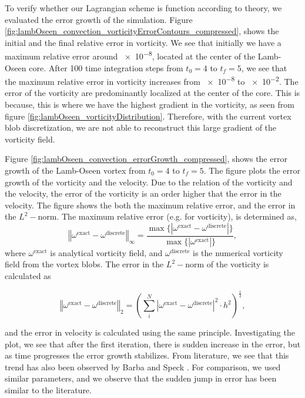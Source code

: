 To verify whether our Lagrangian scheme is function according to theory, we evaluated the error growth of the simulation. Figure \ref{fig:lambOseen_convection_vorticityErrorContours_compressed}, shows the initial and the final relative error in vorticity. We see that initially we have a maximum relative error around \num{e-8}, located at the center of the Lamb-Oseen core. After 100 time integration steps from $t_0=4$ to $t_f=5$, we see that the maximum relative error in vorticity increases from \num{e-8} to \num{e-2}. The error of the vorticity are predominantly localized at the center of the core. This is because, this is where we have the highest gradient in the vorticity, as seen from figure \ref{fig:lambOseen_vorticityDistribution}. Therefore, with the current vortex blob discretization, we are not able to reconstruct this large gradient of the vorticity field. 

Figure \ref{fig:lambOseen_convection_errorGrowth_compressed}, shows the error growth of the Lamb-Oseen vortex from $t_0=4$ to $t_f=5$. The figure plots the error growth of the vorticity and the velocity. Due to the relation of the vorticity and the velocity, the error of the vorticity is an order higher that the error in the velocity. The figure shows the both the maximum relative error, and the error in the $L^2-\mathrm{norm}$. The maximum relative error (e.g. for vorticity), is determined as,
	\begin{equation}
	\left\Vert \omega^{\mathrm{exact}} - \omega^{\mathrm{discrete}} \right\Vert_{\infty} = \frac{\max\{\left|\omega^{\mathrm{exact}} - \omega^{\mathrm{discrete}}\right|\}}{\max\{\left|\omega^{\mathrm{exact}}\right|\}},
	\label{eq:maxRelErrorDef}
	\end{equation}
where $\omega^{\mathrm{exact}}$ is analytical vorticity field, and $\omega^{\mathrm{discrete}}$ is the numerical vorticity field from the vortex blobs. The error in the $L^2-\mathrm{norm}$ of the vorticity is calculated as 

	\begin{equation}
	\left\Vert \omega^{\mathrm{exact}} - \omega^{\mathrm{discrete}} \right\Vert_2 = \left(\sum_{i}^{N}\left| \omega^{\mathrm{exact}} - \omega^{\mathrm{discrete}} \right|^2 \cdot h^2\right)^{\frac{1}{2}},
	\end{equation}

and the error in velocity is calculated using the same principle. Investigating the plot, we see that after the first iteration, there is sudden increase in the error, but as time progresses the error growth stabilizes. From literature, we see that this trend has also been observed by Barba \cite{Barba2004c} and Speck \cite{Speck2011a}. For comparison, we used similar parameters, and we observe that the sudden jump in error has been similar to the literature.
	
